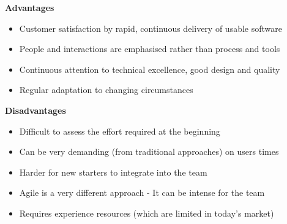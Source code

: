 \documentclass[a4paper,10pt]{article}
\begin{document}
\textcolor{BlueGreen}{\textbf{Advantages}}
\begin{itemize}
	\item Customer satisfaction by rapid, continuous delivery of usable software 
	\item People and interactions are emphasised rather than process and tools 
	\item Continuous attention to technical excellence, good design and quality 
	\item Regular adaptation to changing circumstances \\
\end{itemize}
\textcolor{BlueGreen}{\textbf{Disadvantages}}
\begin{itemize}
	\item Difficult to assess the effort required at the beginning 
	\item Can be very demanding (from traditional approaches) on users times 
	\item Harder for new starters to integrate into the team 
	\item Agile is a very different approach - It can be intense for the team 
	\item Requires experience resources (which are limited in today's market)
\end{itemize}
\newpage 
\end{document}
